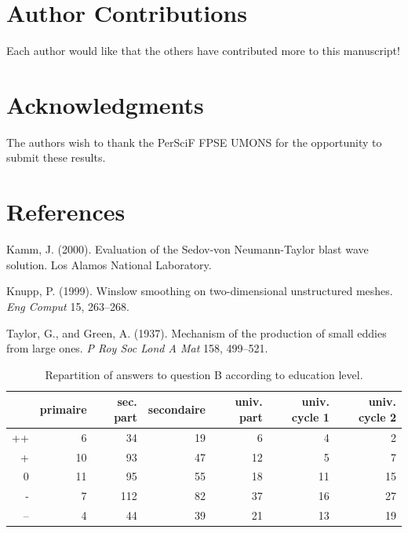 \documentclass[utf8]{frontiersSCNS}
\newlength{\cslhangindent}
\newlength{\cslentryspacingunit} %
\newenvironment{CSLReferences}[2] %
 {%
  \setlength{\parindent}{0pt}
  \ifodd #1
  \let\oldpar\par
  \def\par{\hangindent=\cslhangindent\oldpar}
  \fi
  \setlength{\parskip}{#2\cslentryspacingunit}
 }%
 {}
\begin{document}
\hypertarget{author-contributions}{%
\section{Author Contributions}\label{author-contributions}}

Each author would like that the others have contributed more to this
manuscript!

\hypertarget{acknowledgments}{%
\section{Acknowledgments}\label{acknowledgments}}

The authors wish to thank the PerSciF FPSE UMONS for the opportunity to
submit these results.

\hypertarget{references}{%
\section*{References}\label{references}}

\hypertarget{refs}{}
\begin{CSLReferences}{1}{0}
\leavevmode{}%
Kamm, J. (2000). Evaluation of the {S}edov-von {N}eumann-{T}aylor blast
wave solution. Los {A}lamos {N}ational {L}aboratory.

\leavevmode{}%
Knupp, P. (1999). Winslow smoothing on two-dimensional unstructured
meshes. \emph{Eng {C}omput} 15, 263--268.

\leavevmode{}%
Taylor, G., and Green, A. (1937). Mechanism of the production of small
eddies from large ones. \emph{P {R}oy {S}oc {L}ond {A} {M}at} 158,
499--521.

\end{CSLReferences}

\begin{table}[ht]
\centering
\begin{tabular}{rrrrrrr}
  \hline
 & primaire & sec. part & secondaire & univ. part & univ. cycle 1 & univ. cycle 2 \\ 
  \hline
++ &   6 &  34 &  19 &   6 &   4 &   2 \\ 
  + &  10 &  93 &  47 &  12 &   5 &   7 \\ 
  0 &  11 &  95 &  55 &  18 &  11 &  15 \\ 
  - &   7 & 112 &  82 &  37 &  16 &  27 \\ 
  -- &   4 &  44 &  39 &  21 &  13 &  19 \\ 
   \hline
\end{tabular}
\caption{Repartition of answers to question B according to education level.} 
\label{tab:b_edu}
\end{table}
\end{document}
